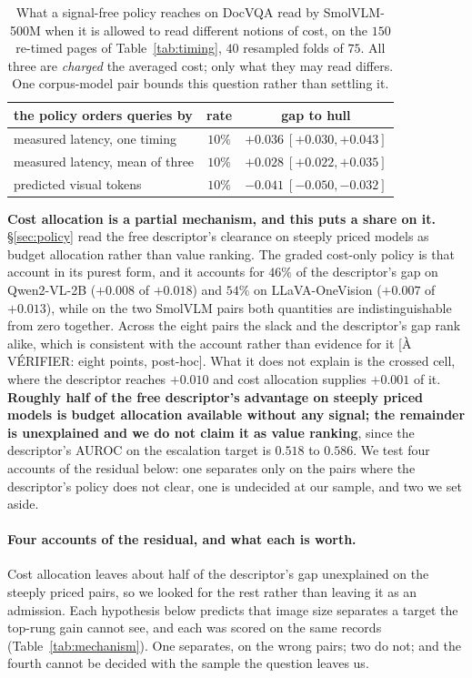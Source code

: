 \documentclass[10pt,twocolumn]{article}
\theoremstyle{plain}
\begin{document}
\begin{table}[t]
\centering\small
\setlength{\tabcolsep}{5pt}
\begin{tabular}{lcc}
\toprule
the policy orders queries by & rate & gap to hull \\
\midrule
measured latency, one timing & $10\%$ & $+0.036\ [+0.030, +0.043]$ \\
measured latency, mean of three & $10\%$ & $+0.028\ [+0.022, +0.035]$ \\
predicted visual tokens & $10\%$ & $-0.041\ [-0.050, -0.032]$ \\
\bottomrule
\end{tabular}
\caption{What a signal-free policy reaches on DocVQA read by SmolVLM-500M when
it is allowed to read different notions of cost, on the $150$ re-timed pages of
Table~\ref{tab:timing}, $40$ resampled folds of $75$. All three are
\emph{charged} the averaged cost; only what they may read differs. One
corpus-model pair bounds this question rather than settling it.}
\label{tab:oracle}
\end{table}

\textbf{Cost allocation is a partial mechanism, and this puts a share on it.}
\S\ref{sec:policy} read the free descriptor's clearance on steeply priced
models as budget allocation rather than value ranking. The graded cost-only
policy is that account in its purest form, and it accounts for $46\%$ of the
descriptor's gap on Qwen2-VL-2B ($+0.008$ of $+0.018$) and $54\%$ on
LLaVA-OneVision ($+0.007$ of $+0.013$), while on the two SmolVLM pairs both
quantities are indistinguishable from zero together. Across the eight pairs the
slack and the descriptor's gap rank alike, which is consistent with the account
rather than evidence for it [À VÉRIFIER: eight points, post-hoc]. What it does not explain is the crossed
cell, where the descriptor reaches $+0.010$ and cost allocation supplies
$+0.001$ of it. \textbf{Roughly half of the free descriptor's advantage on
steeply priced models is budget allocation available without any signal; the
remainder is unexplained and we do not claim it as value ranking}, since the
descriptor's AUROC on the escalation target is $0.518$ to $0.586$. We test
four accounts of the residual below: one separates only on the pairs where the
descriptor's policy does not clear, one is undecided at our sample, and two we
set aside.

\paragraph{Four accounts of the residual, and what each is worth.} Cost
allocation leaves about half of the descriptor's gap unexplained on the steeply
priced pairs, so we looked for the rest rather than leaving it as an admission.
Each hypothesis below predicts that image size separates a target the top-rung
gain cannot see, and each was scored on the same records
(Table~\ref{tab:mechanism}). One separates, on the wrong pairs; two do not; and
the fourth cannot be decided with the sample the question leaves us.
\end{document}
